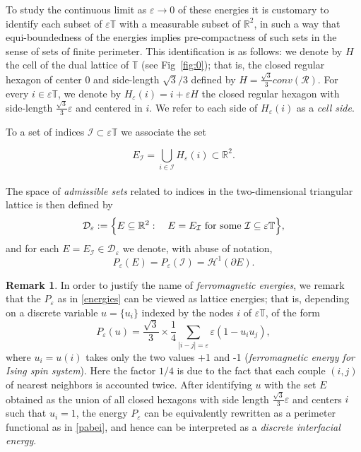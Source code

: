 \documentclass{interact}
\numberwithin{equation}{section}
\theoremstyle{definition}
\newtheorem{oss}[thm]{Remark}
\newcommand{\R}{\mathbb{R}}
\newcommand{\I}{\mathcal{I}}
\newcommand{\D}{\mathcal{D}}
\renewcommand{\epsilon}{\varepsilon}
\def\e{\epsilon}
\begin{document}
To study the continuous limit as $\e\to0$ of these energies it is customary to identify each subset of $\e\mathbb{T}$ with a measurable subset of $\R^2$, in such a way that equi-boundedness of the energies implies pre-compactness of such sets in the sense of sets of finite perimeter. This identification is as follows: we denote by $H$ the cell of the dual lattice of $\mathbb{T}$ (see Fig~\ref{fig:0}); that is, the closed regular hexagon of center $0$ and side-length $\sqrt 3/3$ defined by %
$H=\frac{\sqrt 3}{3}conv(\mathcal{R})$. For every ${i}\in\epsilon\mathbb{T}$, we denote by $H_\epsilon( {i})= {i}+\epsilon H$ the closed regular hexagon with side-length $\frac{\sqrt 3}{3}\epsilon$ and centered in $ {i}$. We refer to each side of $H_\epsilon( {i})$ as a \emph{cell side}. 

To a set of indices $\I\subset\epsilon\mathbb{T}$ we associate the set

\begin{equation*}
E_{\I}=\bigcup_{ {i}\in \I}H_\epsilon( {i})\subset\R^2.
\end{equation*} 
\\
The space of \emph{admissible sets} related to indices in the two\hbox{-}dimensional triangular lattice is then defined by
\begin{equation}
\D_\epsilon:=\Bigl\{E\subseteq\R^2:\quad E=E_\I\text{ for some $\I\subseteq\epsilon\mathbb{T}$}\Bigr\},
\label{admissibleset}
\end{equation}
and for each $E=E_\I\in \D_\epsilon$ we denote, with abuse of notation,
\begin{equation}\label{pabei}
P_\epsilon(E)=P_\epsilon(\I)=\mathcal{H}^1(\partial E).
\end{equation}

\begin{oss}\label{justify}
In order to justify the name of \emph{ferromagnetic energies}, we remark that the $P_\epsilon$ as in \eqref{energies} can be viewed as lattice energies; that is, depending on a discrete variable $u=\{u_i\}$ indexed by the nodes $i$ of $\e\mathbb{T}$, of the form
\begin{equation}
P_\epsilon(u)=\frac{\sqrt{3}}{3}\times\frac{1}{4}\sum_{|i-j|=\epsilon}\epsilon(1-u_iu_j),
\end{equation}
where $u_i=u(i)$ takes only the two values +1 and -1 (\emph{ferromagnetic energy for Ising spin system}). Here the factor $1/4$ is due to the fact that each couple $(i,j)$ of nearest neighbors is accounted twice. After
identifying $u$ with the set $E$ obtained as the union of all closed hexagons with side length $\frac{\sqrt{3}}{3}\epsilon$ and centers $i$
such that $u_i = 1$, the energy $P_\epsilon$ can be equivalently rewritten as a perimeter functional as in \eqref{pabei}, and hence can be interpreted as a \emph{discrete interfacial energy}.
\end{oss}
\end{document}
